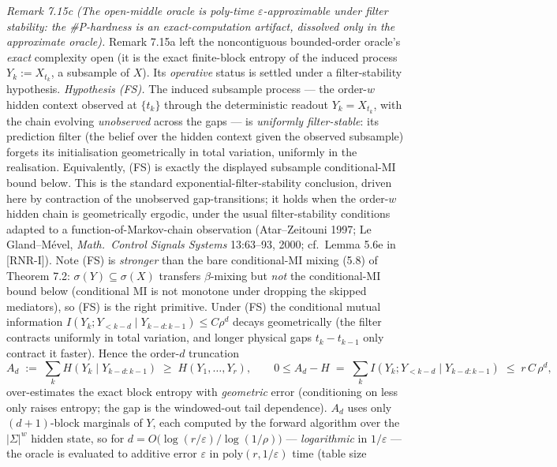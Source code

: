 \documentclass[
]{article}
\begin{document}
\emph{Remark 7.15c (The open-middle oracle is poly-time $\varepsilon$-approximable
under filter stability: the \#P-hardness is an exact-computation artifact, dissolved
only in the approximate oracle).} Remark 7.15a
left the noncontiguous bounded-order oracle's \emph{exact} complexity open (it is
the exact finite-block entropy of the induced process $Y_k:=X_{t_k}$, a subsample
of $X$). Its \emph{operative} status is settled under a filter-stability hypothesis.
\emph{Hypothesis (FS).} The induced subsample process --- the order-$w$ hidden
context observed at $\{t_k\}$ through the deterministic readout $Y_k=X_{t_k}$, with
the chain evolving \emph{unobserved} across the gaps --- is \emph{uniformly
filter-stable}: its prediction filter (the belief over the hidden context given the
observed subsample) forgets its initialisation geometrically in total variation,
uniformly in the realisation. Equivalently, (FS) is exactly the displayed subsample
conditional-MI bound below. This is the standard exponential-filter-stability
conclusion, driven here by contraction of the unobserved gap-transitions; it holds
when the order-$w$ hidden chain is geometrically ergodic, under the usual
filter-stability conditions adapted to a function-of-Markov-chain observation
(Atar--Zeitouni 1997; Le Gland--M\'evel, \emph{Math.\ Control Signals Systems}
13:63--93, 2000; cf.\ Lemma 5.6e in [RNR-I]). Note (FS) is \emph{stronger} than the bare
conditional-MI mixing (5.8) of Theorem 7.2: $\sigma(Y)\subseteq\sigma(X)$ transfers
$\beta$-mixing but \emph{not} the conditional-MI bound below (conditional MI is not
monotone under dropping the skipped mediators), so (FS) is the right primitive.
Under (FS) the conditional mutual information
$I(Y_k;Y_{<k-d}\mid Y_{k-d:k-1})\le C\rho^d$ decays geometrically (the filter
contracts uniformly in total variation, and longer physical gaps $t_{k}-t_{k-1}$
only contract it faster). Hence the order-$d$ truncation
\[
A_d \;:=\; \sum_k H\!\left(Y_k\mid Y_{k-d:k-1}\right)\;\ge\; H(Y_1,\dots,Y_r),
\qquad
0\le A_d - H \;=\; \sum_k I\!\left(Y_k;Y_{<k-d}\mid Y_{k-d:k-1}\right)\;\le\; r\,C\,\rho^d,
\]
over-estimates the exact block entropy with \emph{geometric} error (conditioning
on less only raises entropy; the gap is the windowed-out tail dependence). $A_d$
uses only $(d{+}1)$-block marginals of $Y$, each computed by the forward algorithm
over the $|\Sigma|^w$ hidden state, so for
$d=O\!\big(\log(r/\varepsilon)/\log(1/\rho)\big)$ --- \emph{logarithmic} in
$1/\varepsilon$ --- the oracle is evaluated to additive error $\varepsilon$ in
$\mathrm{poly}(r,1/\varepsilon)$ time (table size
\end{document}
